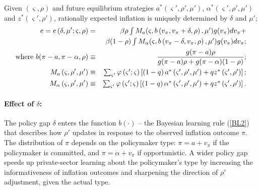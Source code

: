 \documentclass[12pt,letter,leqno]{article}
\theoremstyle{asn}
\theoremstyle{lem}
\theoremstyle{slem}
\theoremstyle{prop}
\theoremstyle{appprop}
\theoremstyle{rem}
\theoremstyle{defn}
\begin{document}
\begin{lem}\label{lem:eApp}%
Given $\left( \varsigma ,\rho \right) $ and future equilibrium strategies $a^{\ast }\left( \varsigma' ,\rho' ,\mu' \right) $, $%
\alpha ^{\ast }\left( \varsigma' ,\rho' ,\mu' \right) $ and $z^{\ast }\left(
\varsigma' ,\rho' \right) $, rationally expected inflation is uniquely
determined by $\delta$ and $\mu'$;%
\begin{eqnarray}
e =e\left( \delta ,\mu ^{\prime };\varsigma ,\rho \right) &=&\beta \rho \textstyle\int 
M_{a}(\varsigma ,b\left( v_\pi,v_\pi +\delta ,\rho \right) ,\mu ^{\prime })g(v_\pi)
dv_\pi+  \label{eq:RE} \\
&&\beta (1-\rho )\textstyle\int M_{\alpha}(\varsigma ,b\left(v_\pi -\delta ,v_\pi ,\rho \right) ,\mu ^{\prime })g(
v_\pi) dv_\pi; \notag\\
\text{where } b(\pi-a,\pi-\alpha,\rho) &\equiv&\frac{g(\pi-a)\rho}{g(\pi-a)\rho+g(\pi-\alpha)(1-\rho)}; \notag \\
M_{a}\left( \varsigma ,\rho ^{\prime },\mu ^{\prime }\right)
&\equiv&\textstyle\sum_{\varsigma ^{\prime }}\varphi \left( \varsigma ^{\prime };\varsigma
\right) \left[ \left( 1-q\right) a^{\ast }\left( \varsigma ^{\prime },\rho
^{\prime },\mu ^{\prime }\right) +qz^{\ast }\left( \varsigma ^{\prime },\rho
^{\prime }\right) \right] ;  \notag\\
M_{\alpha}\left( \varsigma ,\rho ^{\prime },\mu ^{\prime }\right)
&\equiv&\textstyle\sum_{\varsigma ^{\prime }}\varphi \left( \varsigma ^{\prime };\varsigma
\right) \left[ \left( 1-q\right) \alpha ^{\ast }\left( \varsigma ^{\prime
},\rho ^{\prime },\mu ^{\prime }\right) +qz^{\ast }\left( \varsigma ^{\prime
},\rho ^{\prime }\right) \right] .  \notag
\end{eqnarray}%
\end{lem}%
\paragraph{Effect of $\delta$:} The policy gap $\delta$ enters the function $b(\cdot)$ -- the Bayesian learning rule (\ref{BL2}) that describes how $\rho'$ updates in response to the observed inflation outcome $\pi$. The distribution of $\pi$ depends on the policymaker type: $\pi = a + v_\pi$ if the policymaker is committed, and $\pi = \alpha + v_\pi$ if opportunistic. A wider policy gap speeds up private-sector learning about the policymaker’s type by increasing the informativeness of inflation outcomes and sharpening the direction of $\rho'$ adjustment, given the actual type.
\end{document}
